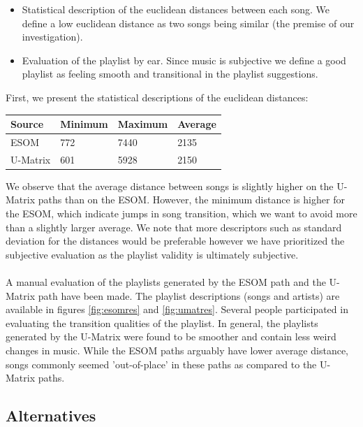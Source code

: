\begin{itemize}
\item Statistical description of the euclidean distances between each song. We define a low euclidean distance as two songs being similar (the premise of our investigation).
\item Evaluation of the playlist by ear. Since music is subjective we define a good playlist as feeling smooth and transitional in the playlist suggestions.
\end{itemize}

First, we present the statistical descriptions of the euclidean distances: 

\begin{center}
    \begin{tabular}{  l | l | l | p{5cm} }
    Source & Minimum & Maximum & Average  \\ \hline
    ESOM & 772 & 7440 & 2135 \\ 
    U-Matrix & 601 & 5928 & 2150 \\ 
    \end{tabular}
\end{center}
\noindent
We observe that the average distance between songs is slightly higher on the U-Matrix paths than on the ESOM. However, the minimum distance is higher for the ESOM, which indicate jumps in song transition, which we want to avoid more than a slightly larger average. We note that more descriptors such as standard deviation for the distances would be  preferable however we have prioritized the subjective evaluation as the playlist validity is ultimately subjective.
\\\\
A manual evaluation of the playlists generated by the ESOM path and the U-Matrix path have been made. The playlist descriptions (songs and artists) are available in  figures \ref{fig:esomres} and \ref{fig:umatres}. Several people participated in evaluating the transition qualities of the playlist. In general, the playlists generated by the U-Matrix were found to be smoother and contain less weird changes in music. While the ESOM paths arguably have lower average distance, songs commonly seemed 'out-of-place' in these paths as compared to the U-Matrix paths.

\subsection{Alternatives}

